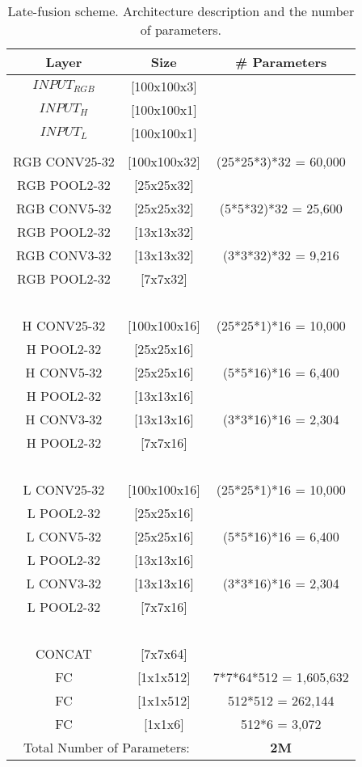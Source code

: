 \documentclass[review,12pt,3p]{elsarticle}
\begin{document}
\begin{table}[!ht]
\centering
\scriptsize
\begin{tabular}{  c  c |  c}

      Layer &    Size      & \# Parameters \\
               \hline
$INPUT_{RGB}$ &    [100x100x3]& \\
$INPUT_H$   &   [100x100x1]& \\
$INPUT_L$   &   [100x100x1]& \\
  		&      \\
RGB CONV25-32& [100x100x32] 		&   (25*25*3)*32 	  =      60,000\\
RGB POOL2-32&  [25x25x32] 	& \\
RGB CONV5-32&  [25x25x32] 		&   (5*5*32)*32 	  =      25,600\\
RGB POOL2-32&  [13x13x32] 	& \\
RGB CONV3-32&  [13x13x32] 		&   (3*3*32)*32 	  =       9,216\\
RGB POOL2-32&  [7x7x32] 		&   \\
&~ & \\
H CONV25-32& [100x100x16] 		&   (25*25*1)*16 	  =      10,000\\
H POOL2-32&  [25x25x16] 	& \\
H CONV5-32&  [25x25x16] 		&   (5*5*16)*16 	  =       6,400\\
H POOL2-32&  [13x13x16] 	& \\
H CONV3-32&  [13x13x16] 		&   (3*3*16)*16 	  =       2,304\\
H POOL2-32&  [7x7x16] 		&   \\
&~ & \\
L CONV25-32& [100x100x16] 		&   (25*25*1)*16 	  =      10,000\\
L POOL2-32&  [25x25x16] 	& \\
L CONV5-32&  [25x25x16] 		&   (5*5*16)*16 	  =       6,400\\
L POOL2-32&  [13x13x16] 	& \\
L CONV3-32&  [13x13x16] 		&   (3*3*16)*16 	  =       2,304\\
L POOL2-32&  [7x7x16] 		&   \\
& ~ & \\
CONCAT      & [7x7x64]  & \\
FC&         [1x1x512] 			&   7*7*64*512   	  =    1,605,632\\
FC&         [1x1x512] 			&   512*512 	          =      262,144\\
FC&         [1x1x6]			&   512*6 	  	  =        3,072\\
\hline

\multicolumn{2}{c}{ Total Number of Parameters:} & \textbf{2M} \\

\end{tabular}

\caption{Late-fusion scheme. Architecture description and the number of parameters.}
\label{tab:lateStyle}
\end{table}
\end{document}
